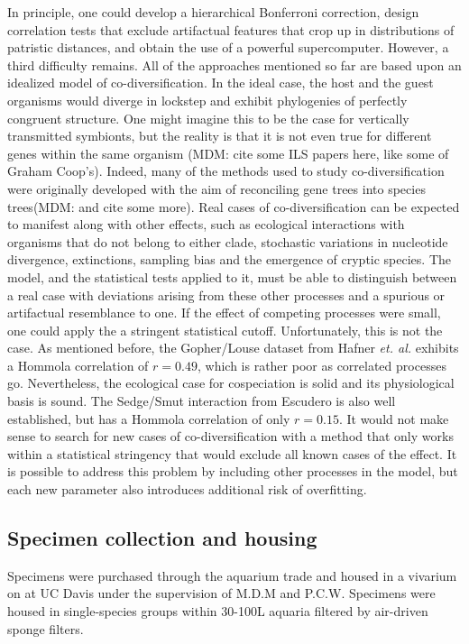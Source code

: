 In principle, one could develop a hierarchical Bonferroni correction, design correlation tests that exclude artifactual features that crop up in distributions of patristic distances, and obtain the use of a powerful supercomputer. However, a third difficulty remains. All of the approaches mentioned so far are based upon an idealized model of co-diversification. In the ideal case, the host and the guest organisms would diverge in lockstep and exhibit phylogenies of perfectly congruent structure. One might imagine this to be the case for vertically transmitted symbionts, but the reality is that it is not even true for different genes within the same organism (MDM: cite some ILS papers here, like some of Graham Coop's). Indeed, many of the methods used to study co-diversification were originally developed with the aim of reconciling gene trees into species trees(MDM: and cite some more). Real cases of co-diversification can be expected to manifest along with other effects, such as ecological interactions with organisms that do not belong to either clade, stochastic variations in nucleotide divergence, extinctions, sampling bias and the emergence of cryptic species. The model, and the statistical tests applied to it, must be able to distinguish between a real case with deviations arising from these other processes and a spurious or artifactual resemblance to one. If the effect of competing processes were small, one could apply the a stringent statistical cutoff. Unfortunately, this is not the case. As mentioned before, the Gopher/Louse dataset from Hafner {\em et. al.} exhibits a Hommola correlation of $r=0.49$, which is rather poor as correlated processes go. Nevertheless, the ecological case for cospeciation is solid and its physiological basis is sound. The Sedge/Smut interaction from Escudero \cite{escudero2015phylogenetic} is also well established, but has a Hommola correlation of only $r=0.15$. It would not make sense to search for new cases of co-diversification with a method that only works within a statistical stringency that would exclude all known cases of the effect. It is possible to address this problem by including other processes in the model, but each new parameter also introduces additional risk of overfitting.

\subsection{Specimen collection and housing}

Specimens were purchased through the aquarium trade and housed in a vivarium on at UC Davis under the supervision of M.D.M and P.C.W. Specimens were housed in single-species groups within 30-100L aquaria filtered by air-driven sponge filters.

